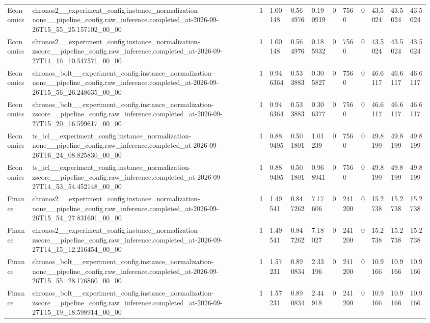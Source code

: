 \begin{tabular}{llllllllllll}
Economics & chronos2\_\_experiment\_config.instance\_normalization-none\_\_pipeline\_config.raw\_inference.completed\_at-2026-09-26T15\_55\_25.157102\_00\_00 & 1 & 1.00148 & 0.564976 & 0.190919 & 0 & 7560 & 0 & 43.5024 & 43.5024 & 43.5024 \\
Economics & chronos2\_\_experiment\_config.instance\_normalization-zscore\_\_pipeline\_config.raw\_inference.completed\_at-2026-09-27T14\_16\_10.547571\_00\_00 & 1 & 1.00148 & 0.564976 & 0.185932 & 0 & 7560 & 0 & 43.5024 & 43.5024 & 43.5024 \\
Economics & chronos\_bolt\_\_experiment\_config.instance\_normalization-none\_\_pipeline\_config.raw\_inference.completed\_at-2026-09-26T15\_56\_26.248635\_00\_00 & 1 & 0.946364 & 0.533883 & 0.305827 & 0 & 7560 & 0 & 46.6117 & 46.6117 & 46.6117 \\
Economics & chronos\_bolt\_\_experiment\_config.instance\_normalization-zscore\_\_pipeline\_config.raw\_inference.completed\_at-2026-09-27T15\_20\_16.599617\_00\_00 & 1 & 0.946364 & 0.533883 & 0.306377 & 0 & 7560 & 0 & 46.6117 & 46.6117 & 46.6117 \\
Economics & ts\_icl\_\_experiment\_config.instance\_normalization-none\_\_pipeline\_config.raw\_inference.completed\_at-2026-09-26T16\_24\_08.825830\_00\_00 & 1 & 0.889495 & 0.501801 & 1.01239 & 0 & 7560 & 0 & 49.8199 & 49.8199 & 49.8199 \\
Economics & ts\_icl\_\_experiment\_config.instance\_normalization-zscore\_\_pipeline\_config.raw\_inference.completed\_at-2026-09-27T14\_53\_54.452148\_00\_00 & 1 & 0.889495 & 0.501801 & 0.968941 & 0 & 7560 & 0 & 49.8199 & 49.8199 & 49.8199 \\
Finance & chronos2\_\_experiment\_config.instance\_normalization-none\_\_pipeline\_config.raw\_inference.completed\_at-2026-09-26T15\_54\_27.831601\_00\_00 & 1 & 1.49541 & 0.847262 & 7.17606 & 0 & 241200 & 0 & 15.2738 & 15.2738 & 15.2738 \\
Finance & chronos2\_\_experiment\_config.instance\_normalization-zscore\_\_pipeline\_config.raw\_inference.completed\_at-2026-09-27T14\_15\_12.216454\_00\_00 & 1 & 1.49541 & 0.847262 & 7.18027 & 0 & 241200 & 0 & 15.2738 & 15.2738 & 15.2738 \\
Finance & chronos\_bolt\_\_experiment\_config.instance\_normalization-none\_\_pipeline\_config.raw\_inference.completed\_at-2026-09-26T15\_55\_28.176860\_00\_00 & 1 & 1.57231 & 0.890834 & 2.33196 & 0 & 241200 & 0 & 10.9166 & 10.9166 & 10.9166 \\
Finance & chronos\_bolt\_\_experiment\_config.instance\_normalization-zscore\_\_pipeline\_config.raw\_inference.completed\_at-2026-09-27T15\_19\_18.598914\_00\_00 & 1 & 1.57231 & 0.890834 & 2.44918 & 0 & 241200 & 0 & 10.9166 & 10.9166 & 10.9166 \\

\end{tabular}
